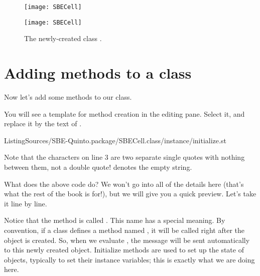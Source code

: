 \documentclass[a4paper,10pt,twoside]{book}
\begin{document}

\begin{figure}[h!t]
\ifluluelse
	{\centerline {\texttt{[image: SBECell]}}}
	{\centerline {\texttt{[image: SBECell]}}}
\caption{The newly-created class \label{fig:SBECell}.}
\end{figure}

\section{Adding methods to a class}

Now let's add some methods to our class.

You will see a template for method creation in the editing pane.
Select it, and replace it by the text of .

%
{ListingSources/SBE-Quinto.package/SBECell.class/instance/initialize.st}	

\noindent
Note that the characters  on line 3 are two separate single quotes with nothing between them, not a double quote!
 denotes the empty string.


What does the above code do?
We won't go into all of the details here (that's what the rest of the book is for!), but we will give you a quick preview.
Let's take it line by line.

Notice that the method is called .
This name has a special meaning.
By convention, if a class defines a method named , it will be called right after the object is created.
So, when we evaluate , the message  will be sent automatically to this newly created object.
Initialize methods are used to set up the state of objects, typically to set their instance variables; this is exactly what we are doing here.
\end{document}
